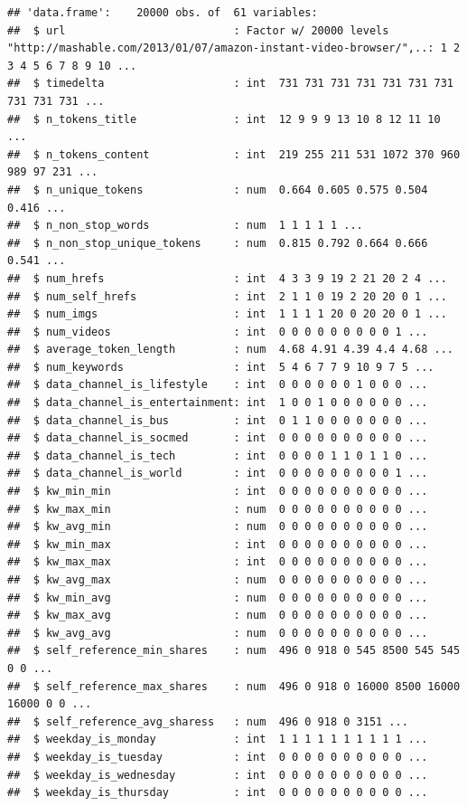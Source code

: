 \documentclass[]{article}
\begin{document}
\begin{verbatim}
## 'data.frame':    20000 obs. of  61 variables:
##  $ url                          : Factor w/ 20000 levels "http://mashable.com/2013/01/07/amazon-instant-video-browser/",..: 1 2 3 4 5 6 7 8 9 10 ...
##  $ timedelta                    : int  731 731 731 731 731 731 731 731 731 731 ...
##  $ n_tokens_title               : int  12 9 9 9 13 10 8 12 11 10 ...
##  $ n_tokens_content             : int  219 255 211 531 1072 370 960 989 97 231 ...
##  $ n_unique_tokens              : num  0.664 0.605 0.575 0.504 0.416 ...
##  $ n_non_stop_words             : num  1 1 1 1 1 ...
##  $ n_non_stop_unique_tokens     : num  0.815 0.792 0.664 0.666 0.541 ...
##  $ num_hrefs                    : int  4 3 3 9 19 2 21 20 2 4 ...
##  $ num_self_hrefs               : int  2 1 1 0 19 2 20 20 0 1 ...
##  $ num_imgs                     : int  1 1 1 1 20 0 20 20 0 1 ...
##  $ num_videos                   : int  0 0 0 0 0 0 0 0 0 1 ...
##  $ average_token_length         : num  4.68 4.91 4.39 4.4 4.68 ...
##  $ num_keywords                 : int  5 4 6 7 7 9 10 9 7 5 ...
##  $ data_channel_is_lifestyle    : int  0 0 0 0 0 0 1 0 0 0 ...
##  $ data_channel_is_entertainment: int  1 0 0 1 0 0 0 0 0 0 ...
##  $ data_channel_is_bus          : int  0 1 1 0 0 0 0 0 0 0 ...
##  $ data_channel_is_socmed       : int  0 0 0 0 0 0 0 0 0 0 ...
##  $ data_channel_is_tech         : int  0 0 0 0 1 1 0 1 1 0 ...
##  $ data_channel_is_world        : int  0 0 0 0 0 0 0 0 0 1 ...
##  $ kw_min_min                   : int  0 0 0 0 0 0 0 0 0 0 ...
##  $ kw_max_min                   : num  0 0 0 0 0 0 0 0 0 0 ...
##  $ kw_avg_min                   : num  0 0 0 0 0 0 0 0 0 0 ...
##  $ kw_min_max                   : int  0 0 0 0 0 0 0 0 0 0 ...
##  $ kw_max_max                   : int  0 0 0 0 0 0 0 0 0 0 ...
##  $ kw_avg_max                   : num  0 0 0 0 0 0 0 0 0 0 ...
##  $ kw_min_avg                   : num  0 0 0 0 0 0 0 0 0 0 ...
##  $ kw_max_avg                   : num  0 0 0 0 0 0 0 0 0 0 ...
##  $ kw_avg_avg                   : num  0 0 0 0 0 0 0 0 0 0 ...
##  $ self_reference_min_shares    : num  496 0 918 0 545 8500 545 545 0 0 ...
##  $ self_reference_max_shares    : num  496 0 918 0 16000 8500 16000 16000 0 0 ...
##  $ self_reference_avg_sharess   : num  496 0 918 0 3151 ...
##  $ weekday_is_monday            : int  1 1 1 1 1 1 1 1 1 1 ...
##  $ weekday_is_tuesday           : int  0 0 0 0 0 0 0 0 0 0 ...
##  $ weekday_is_wednesday         : int  0 0 0 0 0 0 0 0 0 0 ...
##  $ weekday_is_thursday          : int  0 0 0 0 0 0 0 0 0 0 ...

\end{verbatim}
\end{document}
